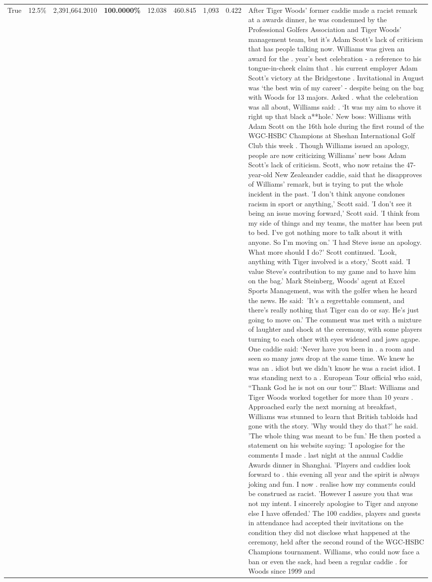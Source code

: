 \begin{table}[H]
\begin{tabular}{lllrlllll}
True & 12.5\% & 2,391,664.2010 & \bfseries \color{red} 100.0000\% & 12.038 & 460.845 & 1,093 & 0.422 & After Tiger Woods' former caddie made a racist remark at a awards dinner, he was condemned by the Professional Golfers Association and Tiger Woods' management team, but it's Adam Scott's lack of criticism that has people talking now. Williams was given an award for the . year’s best celebration - a reference to his tongue-in-cheek claim that . his current employer Adam Scott’s victory at the Bridgestone . Invitational in August was ‘the best win of my career’ - despite being on the bag with Woods for 13 majors. Asked . what the celebration was all about, Williams said: . ‘It was my aim to shove it right up that black a**hole.’ New boss: Williams with Adam Scott  on the 16th hole during the first round of the WGC-HSBC Champions at Sheshan International Golf Club this week . Though Williams issued an apology, people are now criticizing Williams' new boss Adam Scott's lack of criticism. Scott, who now retains the 47-year-old New Zealeander caddie, said that he disapproves of Williams' remark, but is trying to put the whole incident in the past. 'I don't think anyone condones racism in sport or anything,' Scott said. 'I don't see it being an issue moving forward,' Scott said. 'I think from my side of things and my teams, the matter has been put to bed. I've got nothing more to talk about it with anyone. So I'm moving on.' 'I had Steve issue an apology. What more should I do?' Scott continued. 'Look, anything with Tiger involved is a story,' Scott said. 'I value Steve's contribution to my game and to have him on the bag.' Mark Steinberg, Woods' agent at Excel Sports Management, was with the golfer when he heard the news. He said: 'It's a regrettable comment, and there's really nothing that Tiger can do or say. He's just going to move on.' The comment was met with a mixture of laughter and shock at the ceremony, with some players turning to each other with eyes widened and jaws agape. One caddie said: ‘Never have you been in . a room and seen so many jaws drop at the same time. We knew he was an . idiot but we didn’t know he was a racist idiot. I was standing next to a . European Tour official who said, “Thank God he is not on our tour”.’ Blast: Williams and Tiger Woods worked together for more than 10 years . Approached early the next morning at breakfast, Williams was stunned to learn that British tabloids had gone with the story. 'Why would they do that?' he said. 'The whole thing was meant to be fun.' He then posted a statement on his website saying: 'I apologise for the comments I made . last night at the annual Caddie Awards dinner in Shanghai. 'Players and caddies look forward to . this evening all year and the spirit is always joking and fun. I now . realise how my comments could be construed as racist. 'However I assure you that was not my intent. I sincerely apologise to Tiger and anyone else I have offended.' The 100 caddies, players and guests in attendance had accepted their invitations on the condition they did not disclose what happened at the ceremony, held after the second round of the WGC-HSBC Champions tournament. Williams, who could now face a ban or even the sack, had been a regular caddie . for Woods since 1999 and 
\end{tabular}
\end{table}
